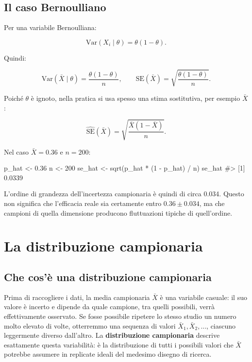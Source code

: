 \documentclass[
  italian,
  letterpaper,
  a4paper,
  11pt,
  open=any]{scrbook}
\newenvironment{Shaded}{\begin{snugshade}}{\end{snugshade}}
\newcommand{\CommentTok}[1]{\textcolor[rgb]{0.37,0.37,0.37}{#1}}
\newcommand{\DecValTok}[1]{\textcolor[rgb]{0.68,0.00,0.00}{#1}}
\newcommand{\FloatTok}[1]{\textcolor[rgb]{0.68,0.00,0.00}{#1}}
\newcommand{\FunctionTok}[1]{\textcolor[rgb]{0.28,0.35,0.67}{#1}}
\newcommand{\NormalTok}[1]{\textcolor[rgb]{0.00,0.23,0.31}{#1}}
\newcommand{\OtherTok}[1]{\textcolor[rgb]{0.00,0.23,0.31}{#1}}
\newcommand{\SpecialCharTok}[1]{\textcolor[rgb]{0.37,0.37,0.37}{#1}}
\theoremstyle{plain}
\theoremstyle{definition}
\theoremstyle{definition}
\theoremstyle{remark}
\begin{document}
\subsection{Il caso Bernoulliano}\label{il-caso-bernoulliano}

Per una variabile Bernoulliana:

\[
\text{Var}(X_i \mid \theta) = \theta(1-\theta).
\]

Quindi:

\[
\text{Var}(\bar{X} \mid \theta) = \frac{\theta(1-\theta)}{n},
\qquad
\text{SE}(\bar{X}) = \sqrt{\frac{\theta(1-\theta)}{n}}.
\]

Poiché \(\theta\) è ignoto, nella pratica si usa spesso una stima
sostitutiva, per esempio \(\bar{X}\):

\[
\widehat{\text{SE}}(\bar{X}) = \sqrt{\frac{\bar{X}(1-\bar{X})}{n}}.
\]

Nel caso \(\bar{X}=0.36\) e \(n=200\):

\begin{Shaded}
\begin{Highlighting}[]
\NormalTok{p\_hat }\OtherTok{\textless{}{-}} \FloatTok{0.36}
\NormalTok{n }\OtherTok{\textless{}{-}} \DecValTok{200}
\NormalTok{se\_hat }\OtherTok{\textless{}{-}} \FunctionTok{sqrt}\NormalTok{(p\_hat }\SpecialCharTok{*}\NormalTok{ (}\DecValTok{1} \SpecialCharTok{{-}}\NormalTok{ p\_hat) }\SpecialCharTok{/}\NormalTok{ n)}
\NormalTok{se\_hat}
\CommentTok{\#\textgreater{} [1] 0.0339}
\end{Highlighting}
\end{Shaded}

L'ordine di grandezza dell'incertezza campionaria è quindi di circa
0.034. Questo non significa che l'efficacia reale sia certamente entro
\(0.36 \pm 0.034\), ma che campioni di quella dimensione producono
fluttuazioni tipiche di quell'ordine.

\section{La distribuzione
campionaria}\label{sec-sampling-distribution-evidence}

\subsection{Che cos'è una distribuzione
campionaria}\label{che-cosuxe8-una-distribuzione-campionaria}

Prima di raccogliere i dati, la media campionaria \(\bar{X}\) è una
variabile casuale: il suo valore è incerto e dipende da quale campione,
tra quelli possibili, verrà effettivamente osservato. Se fosse possibile
ripetere lo stesso studio un numero molto elevato di volte, otterremmo
una sequenza di valori \(\bar{X}_1, \bar{X}_2, \dots\), ciascuno
leggermente diverso dall'altro. La \textbf{distribuzione campionaria}
descrive esattamente questa variabilità: è la distribuzione di tutti i
possibili valori che \(\bar{X}\) potrebbe assumere in replicate ideali
del medesimo disegno di ricerca.
\end{document}
